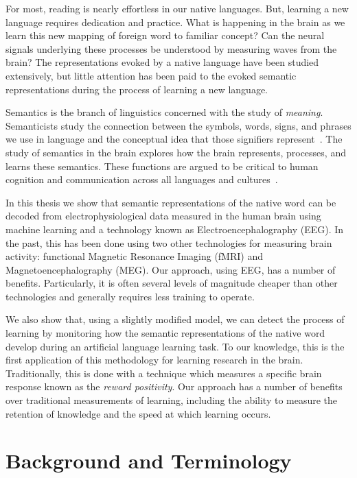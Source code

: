\label{chapter:introduction}

For most, reading is nearly effortless in our native languages. But, learning a 
new language requires dedication and practice. What is happening in the brain 
as we learn this new mapping of foreign word to familiar concept? Can the 
neural signals underlying these processes be understood by measuring waves from 
the brain? The representations evoked by a native language have been studied 
extensively, but little attention has been paid to the evoked semantic 
representations during the process of learning a new language.
 
Semantics is the branch of linguistics concerned with the study of 
\emph{meaning}. Semanticists study the connection between the symbols, words, 
signs, and phrases we use in language and the conceptual idea that those 
signifiers represent~\cite{kreidler2002introducing}. The study of semantics in 
the brain explores how the brain represents, processes, and learns these 
semantics. These functions are argued to be critical to human cognition and 
communication across all languages and cultures~\cite{croft2004cognitive}.

In this thesis we show that semantic representations of the native word can be 
decoded from electrophysiological data measured in the human brain using 
machine learning and a technology known as Electroencephalography (EEG). In the 
past, this has been done using two other technologies for measuring brain 
activity: functional Magnetic Resonance Imaging (fMRI) and 
Magnetoencephalography (MEG).  Our approach, using EEG, has a number of 
benefits. Particularly, it is often several levels of magnitude cheaper than 
other technologies and generally requires less training to operate.

We also show that, using a slightly modified model, we can detect the process 
of learning by monitoring how the semantic representations of the native word 
develop during an artificial language learning task. To our knowledge, this is 
the first application of this methodology for learning research in the brain.  
Traditionally, this is done with a technique which measures a specific brain 
response known as the \emph{reward positivity}. Our approach has a number of 
benefits over traditional measurements of learning, including the ability to 
measure the retention of knowledge and the speed at which learning occurs.

\section{Background and Terminology}

